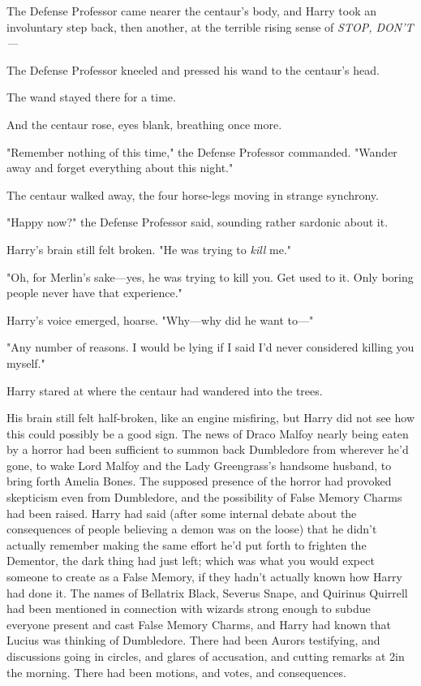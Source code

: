 The Defense Professor came nearer the centaur's body, and Harry took an 
involuntary step back, then another, at the terrible rising sense of 
\emph{STOP, DON'T---}

The Defense Professor kneeled and pressed his wand to the centaur's head.

The wand stayed there for a time.

And the centaur rose, eyes blank, breathing once more.

"Remember nothing of this time," the Defense Professor commanded. "Wander away 
and forget everything about this night."

The centaur walked away, the four horse-legs moving in strange synchrony.

"Happy now?" the Defense Professor said, sounding rather sardonic about it.

Harry's brain still felt broken. "He was trying to \emph{kill} me."

"Oh, for Merlin's sake---yes, he was trying to kill you. Get used to it. Only 
boring people never have that experience."

Harry's voice emerged, hoarse. "Why---why did he want to---"

"Any number of reasons. I would be lying if I said I'd never considered killing 
you myself."

Harry stared at where the centaur had wandered into the trees.

His brain still felt half-broken, like an engine misfiring, but Harry did not 
see how this could possibly be a good sign.
\sbreak
The news of Draco Malfoy nearly being eaten by a horror had been sufficient to 
summon back Dumbledore from wherever he'd gone, to wake Lord Malfoy and the 
Lady Greengrass's handsome husband, to bring forth Amelia Bones. The supposed 
presence of the horror had provoked skepticism even from Dumbledore, and the 
possibility of False Memory Charms had been raised. Harry had said (after some 
internal debate about the consequences of people believing a demon was on the 
loose) that he didn't actually remember making the same effort he'd put forth 
to frighten the Dementor, the dark thing had just left; which was what you 
would expect someone to create as a False Memory, if they hadn't actually known 
how Harry had done it. The names of Bellatrix Black, Severus Snape, and 
Quirinus Quirrell had been mentioned in connection with wizards strong enough 
to subdue everyone present and cast False Memory Charms, and Harry had known 
that Lucius was thinking of Dumbledore. There had been Aurors testifying, and 
discussions going in circles, and glares of accusation, and cutting remarks at 
2\AM in the morning. There had been motions, and votes, and consequences.

